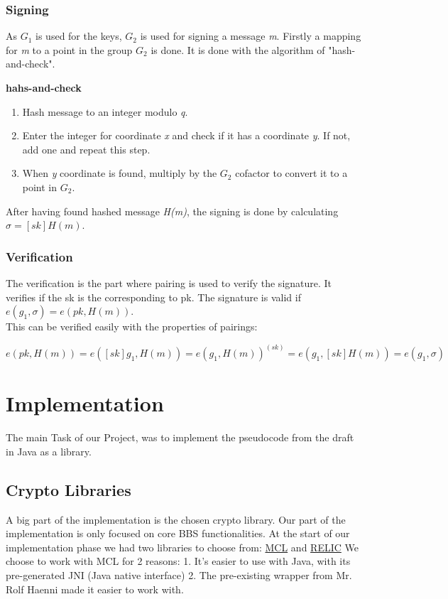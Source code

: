 \documentclass{article}
\begin{document}
\subsubsection{Signing}
As \(G_1\) is used for the keys, \(G_2\) is used for signing a message \textit{m}. Firstly a mapping for \textit{m} to a point in the group \(G_2\) is done. It is done with the algorithm of "hash-and-check". \\
\begin{center}
\textbf{hahs-and-check}
\begin{enumerate}
    \item Hash message to an integer modulo \textit{q}.
    \item Enter the integer for coordinate \textit{x} and check if it has a coordinate \textit{y}. If not, add one and repeat this step.
    \item When \textit{y} coordinate is found, multiply by the \(G_2\) cofactor to convert it to a point in \(G_2\).
\end{enumerate}
\end{center}
After having found hashed message \textit{H(m)}, the signing is done by calculating \(\sigma = [sk]H(m)\). \cite{bls12-381-hackmd}

\subsubsection{Verification}
The verification is the part where pairing is used to verify the signature. It verifies if the sk is the corresponding to pk. The signature is valid if \(e(g_1,\sigma)= e(pk,H(m))\). \\
This can be verified easily with the properties of pairings:
\begin{center}
    \(e(pk,H(m)) = e([sk]g_1,H(m))= e(g_1,H(m))^{(sk)} = e(g_1,[sk]H(m)) = e(g_1,\sigma)\)
\end{center}
\cite{bls12-381-hackmd}


\section{Implementation}
The main Task of our Project, was to implement the pseudocode from the draft in Java as a library.
 
\subsection{Crypto Libraries}
A big part of the implementation is the chosen crypto library. Our part of the implementation is only focused on core BBS functionalities.
At the start of our implementation phase we had two libraries to choose from:
\href{https://github.com/herumi/mcl}{MCL} and \href{https://github.com/relic-toolkit/relic}{RELIC}
We choose to work with MCL for 2 reasons:
1. It's easier to use with Java, with its pre-generated JNI (Java native interface)
2. The pre-existing wrapper from Mr. Rolf Haenni made it easier to work with. \cite{mcl-github}
 
\end{document}
